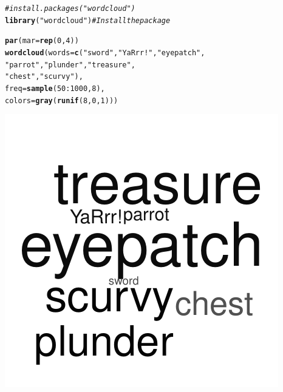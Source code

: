 \documentclass{tufte-book}\usepackage[]{graphicx}\usepackage[]{color}
\makeatletter
\def\maxwidth{ %
  \ifdim\Gin@nat@width>\linewidth
    \linewidth
  \else
    \Gin@nat@width
  \fi
}
\newcommand{\hlnum}[1]{\textcolor[rgb]{0.686,0.059,0.569}{#1}}%
\newcommand{\hlstr}[1]{\textcolor[rgb]{0.192,0.494,0.8}{#1}}%
\newcommand{\hlcom}[1]{\textcolor[rgb]{0.678,0.584,0.686}{\textit{#1}}}%
\newcommand{\hlopt}[1]{\textcolor[rgb]{0,0,0}{#1}}%
\newcommand{\hlstd}[1]{\textcolor[rgb]{0.345,0.345,0.345}{#1}}%
\newcommand{\hlkwc}[1]{\textcolor[rgb]{0.333,0.667,0.333}{#1}}%
\newcommand{\hlkwd}[1]{\textcolor[rgb]{0.737,0.353,0.396}{\textbf{#1}}}%
\newenvironment{kframe}{%
 \def\at@end@of@kframe{}%
 \ifinner\ifhmode%
  \def\at@end@of@kframe{\end{minipage}}%
  \begin{minipage}{\columnwidth}%
 \fi\fi%
 \def\FrameCommand##1{\hskip\@totalleftmargin \hskip-\fboxsep
 \colorbox{shadecolor}{##1}\hskip-\fboxsep
     \hskip-\linewidth \hskip-\@totalleftmargin \hskip\columnwidth}%
 \MakeFramed {\advance\hsize-\width
   \@totalleftmargin\z@ \linewidth\hsize
   \@setminipage}}%
 {\par\unskip\endMakeFramed%
 \at@end@of@kframe}
\newenvironment{knitrout}{}{} %
\makeatother
\begin{document}
\begin{footnotesize}
\begin{knitrout}
\color{fgcolor}\begin{kframe}
\begin{alltt}
\hlcom{#install.packages("wordcloud")}
\hlkwd{library}\hlstd{(}\hlstr{"wordcloud"}\hlstd{)} \hlcom{# Install the package}
\end{alltt}


{\ttfamily\noindent\itshape\color{messagecolor}{\#\# Loading required package: RColorBrewer}}\begin{alltt}
\hlkwd{par}\hlstd{(}\hlkwc{mar} \hlstd{=} \hlkwd{rep}\hlstd{(}\hlnum{0}\hlstd{,} \hlnum{4}\hlstd{))}
\hlkwd{wordcloud}\hlstd{(}\hlkwc{words} \hlstd{=} \hlkwd{c}\hlstd{(}\hlstr{"sword"}\hlstd{,} \hlstr{"YaRrr!"}\hlstd{,} \hlstr{"eyepatch"}\hlstd{,}
                    \hlstr{"parrot"}\hlstd{,} \hlstr{"plunder"}\hlstd{,} \hlstr{"treasure"}\hlstd{,}
                    \hlstr{"chest"}\hlstd{,} \hlstr{"scurvy"}\hlstd{),}
          \hlkwc{freq} \hlstd{=} \hlkwd{sample}\hlstd{(}\hlnum{50}\hlopt{:}\hlnum{1000}\hlstd{,} \hlnum{8}\hlstd{),}
          \hlkwc{colors} \hlstd{=} \hlkwd{gray}\hlstd{(}\hlkwd{runif}\hlstd{(}\hlnum{8}\hlstd{,} \hlnum{0}\hlstd{,} \hlnum{1}\hlstd{)))}
\end{alltt}
\end{kframe}
\includegraphics[width=\maxwidth]{figure/unnamed-chunk-6-1} 

\end{knitrout}
\end{footnotesize}
\end{document}
